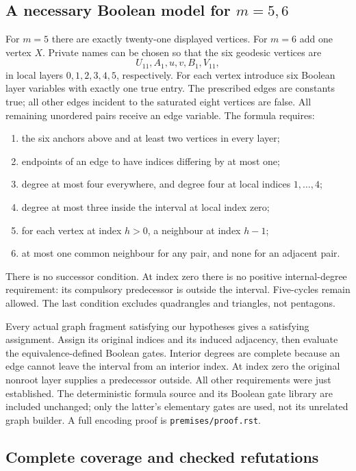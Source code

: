 \documentclass[11pt]{article}
\newcommand{\note}[1]{\nolinkurl{#1}}
\begin{document}
\subsection{A necessary Boolean model for $m=5,6$}

For $m=5$ there are exactly twenty-one displayed vertices. For $m=6$ add
one vertex $X$. Private names can be chosen so that the six geodesic
vertices are
\[
 U_{11},A_1,u,v,B_1,V_{11},
\]
in local layers $0,1,2,3,4,5$, respectively. For each vertex introduce six
Boolean layer variables with exactly one true entry. The prescribed
edges are constants true; all other edges incident to the saturated
eight vertices are false. All remaining unordered pairs receive an edge
variable. The formula requires:
\begin{enumerate}
\item the six anchors above and at least two vertices in every layer;
\item endpoints of an edge to have indices differing by at most one;
\item degree at most four everywhere, and degree four at local indices
      $1,\ldots,4$;
\item degree at most three inside the interval at local index zero;
\item for each vertex at index $h>0$, a neighbour at index $h-1$;
\item at most one common neighbour for any pair, and none for an
      adjacent pair.
\end{enumerate}
There is no successor condition. At index zero there is no positive
internal-degree requirement: its compulsory predecessor is outside the
interval. Five-cycles remain allowed. The last condition excludes
quadrangles and triangles, not pentagons.

Every actual graph fragment satisfying our hypotheses gives a satisfying
assignment. Assign its original indices and its induced adjacency, then
evaluate the equivalence-defined Boolean gates. Interior degrees are
complete because an edge cannot leave the interval from an interior
index. At index zero the original nonroot layer supplies a predecessor
outside. All other requirements were just established. The deterministic
formula source and its Boolean gate library are included unchanged; only
the latter's elementary gates are used, not its unrelated graph builder.
A full encoding proof is \note{premises/proof.rst}.

\subsection{Complete coverage and checked refutations}
\end{document}
